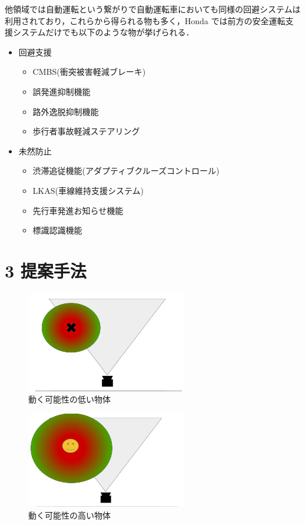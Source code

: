 \documentclass[a4j,10pt]{jsarticle}
\begin{document}
他領域では自動運転という繋がりで自動運転車においても同様の回避システムは利用されており，これらから得られる物も多く，Honda\cite{Honda} では前方の安全運転支援システムだけでも以下のような物が挙げられる．

\begin{itemize}
\item 回避支援
  \begin{itemize}
    \item CMBS(衝突被害軽減ブレーキ)
    \item 誤発進抑制機能
    \item 路外逸脱抑制機能
    \item 歩行者事故軽減ステアリング
  \end{itemize}
\item 未然防止
  \begin{itemize}
    \item 渋滞追従機能(アダプティブクルーズコントロール)
    \item LKAS(車線維持支援システム)
    \item 先行車発進お知らせ機能
    \item 標識認識機能
  \end{itemize}
\end{itemize}


\section{3 提案手法}


\begin{figure}[htbp]
  \includegraphics[width=7cm]{figure1.png}
  \caption{動く可能性の低い物体}
\end{figure}
\begin{figure}[htbp]
  \includegraphics[width=7cm]{figure2.png}
  \caption{動く可能性の高い物体}
\end{figure}
\end{document}
